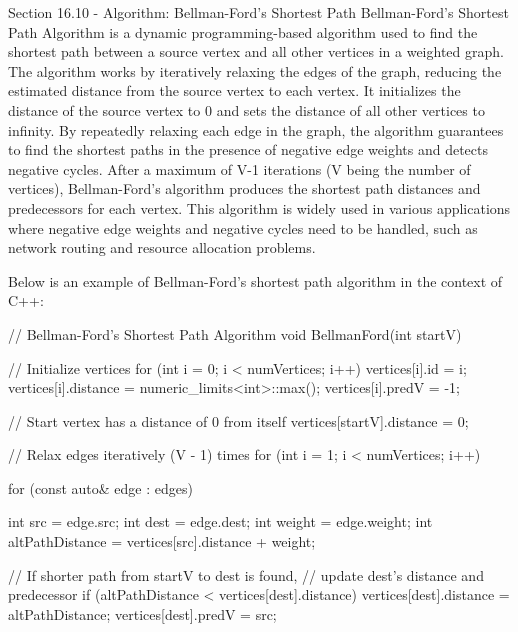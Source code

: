 \begin{notes}{Section 16.10 - Algorithm: Bellman-Ford's Shortest Path}
    Bellman-Ford's Shortest Path Algorithm is a dynamic programming-based algorithm used to find the shortest path between a source vertex and all other vertices in a weighted graph. The algorithm works by iteratively relaxing the 
    edges of the graph, reducing the estimated distance from the source vertex to each vertex. It initializes the distance of the source vertex to 0 and sets the distance of all other vertices to infinity. By repeatedly relaxing each 
    edge in the graph, the algorithm guarantees to find the shortest paths in the presence of negative edge weights and detects negative cycles. After a maximum of V-1 iterations (V being the number of vertices), Bellman-Ford's algorithm 
    produces the shortest path distances and predecessors for each vertex. This algorithm is widely used in various applications where negative edge weights and negative cycles need to be handled, such as network routing and resource 
    allocation problems.
    
    \begin{highlight}
        Below is an example of Bellman-Ford's shortest path algorithm in the context of C++:
    
    \begin{code}[C++]
    // Bellman-Ford's Shortest Path Algorithm
    void BellmanFord(int startV) {
        // Initialize vertices
        for (int i = 0; i < numVertices; i++) {
            vertices[i].id = i;
            vertices[i].distance = numeric_limits<int>::max();
            vertices[i].predV = -1;
        }
    
        // Start vertex has a distance of 0 from itself
        vertices[startV].distance = 0;
    
        // Relax edges iteratively (V - 1) times
        for (int i = 1; i < numVertices; i++) {
            for (const auto& edge : edges) {
                int src = edge.src;
                int dest = edge.dest;
                int weight = edge.weight;
                int altPathDistance = vertices[src].distance + weight;
    
                // If shorter path from startV to dest is found,
                // update dest's distance and predecessor
                if (altPathDistance < vertices[dest].distance) {
                    vertices[dest].distance = altPathDistance;
                    vertices[dest].predV = src;
                }
            }
        }
    
}
\end{code}
\end{highlight}
\end{notes}
